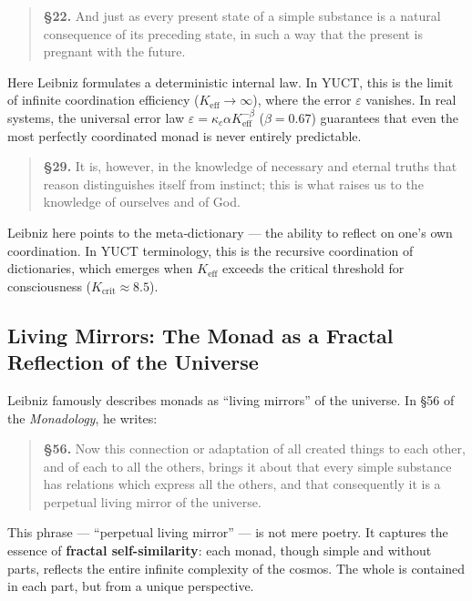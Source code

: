 \documentclass[12pt,a4paper]{article}
\begin{document}
	\begin{quote}
		\textbf{§22.} And just as every present state of a simple substance is a natural consequence of its preceding state, in such a way that the present is pregnant with the future.
	\end{quote}
	
	Here Leibniz formulates a deterministic internal law. In YUCT, this is the limit of infinite coordination efficiency (\(K_{\mathrm{eff}} \to \infty\)), where the error \(\varepsilon\) vanishes. In real systems, the universal error law \(\varepsilon = \kappa_c \alpha K_{\mathrm{eff}}^{-\beta}\) (\(\beta=0.67\)) guarantees that even the most perfectly coordinated monad is never entirely predictable.
	
	\begin{quote}
		\textbf{§29.} It is, however, in the knowledge of necessary and eternal truths that reason distinguishes itself from instinct; this is what raises us to the knowledge of ourselves and of God.
	\end{quote}
	
	Leibniz here points to the meta‑dictionary — the ability to reflect on one’s own coordination. In YUCT terminology, this is the recursive coordination of dictionaries, which emerges when \(K_{\mathrm{eff}}\) exceeds the critical threshold for consciousness (\(K_{\mathrm{crit}} \approx 8.5\)).
	
	\subsection{Living Mirrors: The Monad as a Fractal Reflection of the Universe}
	
	Leibniz famously describes monads as “living mirrors” of the universe. In §56 of the \emph{Monadology}, he writes:
	
	\begin{quote}
		\textbf{§56.} Now this connection or adaptation of all created things to each other, and of each to all the others, brings it about that every simple substance has relations which express all the others, and that consequently it is a perpetual living mirror of the universe.
	\end{quote}
	
	This phrase — “perpetual living mirror” — is not mere poetry. It captures the essence of \textbf{fractal self-similarity}: each monad, though simple and without parts, reflects the entire infinite complexity of the cosmos. The whole is contained in each part, but from a unique perspective.
	
\end{document}
